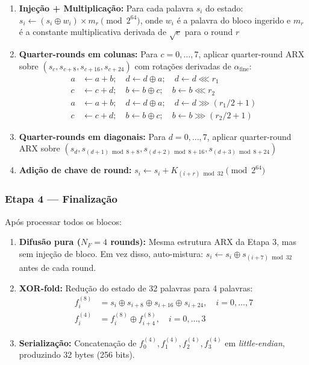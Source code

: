 \documentclass[12pt,a4paper]{article}
\newcommand{\afine}{\alpha_{\mathrm{fine}}}
\begin{document}
\begin{enumerate}[nosep]
\item \textbf{Injeção + Multiplicação:} Para cada palavra $s_i$ do estado: $s_i \leftarrow (s_i \oplus w_i) \times m_r \pmod{2^{64}}$, onde $w_i$ é a palavra do bloco ingerido e $m_r$ é a constante multiplicativa derivada de $\sqrt{e}$ para o round $r$

\item \textbf{Quarter-rounds em colunas:} Para $c = 0, \ldots, 7$, aplicar quarter-round ARX sobre $(s_c, s_{c+8}, s_{c+16}, s_{c+24})$ com rotações derivadas de $\afine$:
\begin{align}
a &\leftarrow a + b; \quad d \leftarrow d \oplus a; \quad d \leftarrow d \lll r_1 \nonumber \\
c &\leftarrow c + d; \quad b \leftarrow b \oplus c; \quad b \leftarrow b \lll r_2 \nonumber \\
a &\leftarrow a + b; \quad d \leftarrow d \oplus a; \quad d \leftarrow d \ggg (r_1/2 + 1) \nonumber \\
c &\leftarrow c + d; \quad b \leftarrow b \oplus c; \quad b \leftarrow b \ggg (r_2/2 + 1) \nonumber
\end{align}

\item \textbf{Quarter-rounds em diagonais:} Para $d = 0, \ldots, 7$, aplicar quarter-round ARX sobre $(s_d, s_{(d+1)\bmod 8 + 8}, s_{(d+2)\bmod 8 + 16}, s_{(d+3)\bmod 8 + 24})$

\item \textbf{Adição de chave de round:} $s_i \leftarrow s_i + K_{(i + r) \bmod 32} \pmod{2^{64}}$
\end{enumerate}

\subsubsection{Etapa 4 --- Finalização}

Após processar todos os blocos:

\begin{enumerate}[nosep]
\item \textbf{Difusão pura ($N_F = 4$ rounds):} Mesma estrutura ARX da Etapa 3, mas sem injeção de bloco. Em vez disso, auto-mistura: $s_i \leftarrow s_i \oplus s_{(i+7) \bmod 32}$ antes de cada round.

\item \textbf{XOR-fold:} Redução do estado de 32 palavras para 4 palavras:
\begin{align}
f_i^{(8)} &= s_i \oplus s_{i+8} \oplus s_{i+16} \oplus s_{i+24}, \quad i = 0,\ldots,7 \nonumber \\
f_i^{(4)} &= f_i^{(8)} \oplus f_{i+4}^{(8)}, \quad i = 0,\ldots,3 \nonumber
\end{align}

\item \textbf{Serialização:} Concatenação de $f_0^{(4)}, f_1^{(4)}, f_2^{(4)}, f_3^{(4)}$ em \textit{little-endian}, produzindo 32 bytes (256 bits).
\end{enumerate}
\end{document}
